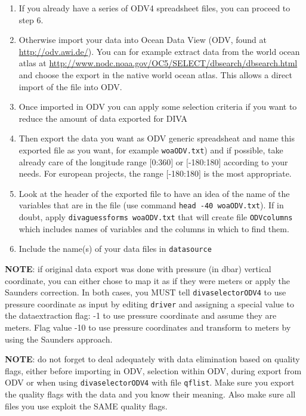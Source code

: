 \documentclass[8pt,a4paper,notitlepage]{book}
\newcommand{\diva}{DIVA}
\begin{document}
\begin{enumerate}
\item If you already have a series of ODV4 spreadsheet files, you can proceed to step 6.
\item Otherwise import your data into Ocean Data View (ODV, found at \url{http://odv.awi.de/}). You can for example extract data from the world ocean atlas at \url{http://www.nodc.noaa.gov/OC5/SELECT/dbsearch/dbsearch.html} and choose the export in the native world ocean atlas. This allows a direct import of the file into ODV.
\item Once imported in ODV you can apply some selection criteria if you want to reduce the amount of data exported for \diva 
\item Then export the data you want as ODV generic spreadsheat and name this exported file as you want, for example {\tt woaODV.txt}) and if possible, take already care of the longitude range  $[$0:360$]$ or $[$-180:180$]$ according to your needs. For european projects, the range $[$-180:180$]$  is the most appropriate.
\item Look at the header of the exported file to have an idea of the name of the variables that are in the file (use command {\tt head -40 woaODV.txt}). If in doubt, apply {\tt divaguessforms woaODV.txt} that will create file {\tt ODVcolumns} which includes names of variables and the columns in which to find them.
\item Include the name(s) of your data files in {\tt datasource}
\end{enumerate}
{\bf NOTE}: if original data export was done with pressure (in dbar) vertical coordinate, you can either chose to map it as if they were meters or apply the Saunders correction. In both cases, you MUST tell {\tt divaselectorODV4} to use pressure coordinate as input by editing {\tt driver} and assigning a special value to the dataextraction flag: -1 to use pressure coordinate and assume they are meters. Flag value -10 to use pressure coordinates and transform to meters by using the Saunders approach.

{\bf NOTE}: do not forget to deal adequately with data elimination based on quality flags, either before importing in ODV, selection within ODV, during export from ODV or when using {\tt divaselectorODV4} with file {\tt qflist}. Make sure  you export the quality flags with the data and you know their meaning. Also make sure all files you use exploit the SAME quality flags.
\end{document}
